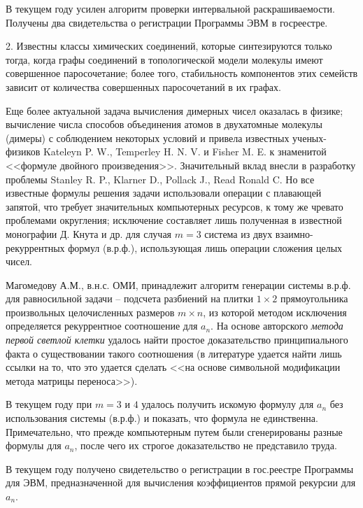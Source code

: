 В текущем году усилен алгоритм проверки интервальной раскрашиваемости. Получены два свидетельства о регистрации Программы ЭВМ в госреестре.

2. Известны классы химических соединений, которые синтезируются только тогда, когда графы соединений в топологической модели молекулы имеют совершенное паросочетание; более того, стабильность компонентов этих семейств зависит от количества совершенных паросочетаний в их графах.

Еще более актуальной задача вычисления димерных чисел оказалась в физике; вычисление числа способов объединения атомов в двухатомные молекулы (димеры) с соблюдением некоторых условий и привела известных ученых-физиков Kateleyn P. W., Temperley H. N. V. и Fisher M. E. к знаменитой <<формуле двойного произведения>>. Значительный вклад внесли в разработку проблемы Stanley R. P., Klarner D., Pollack J., Read Ronald C. Но все известные формулы решения задачи использовали операции с плавающей запятой, что требует значительных компьютерных ресурсов, к тому же чревато проблемами округления; исключение составляет лишь полученная в известной монографии Д. Кнута и др. для случая $m=3$ система из двух взаимно-рекуррентных формул (в.р.ф.), использующая лишь операции сложения целых чисел.

Магомедову А.М., в.н.с. ОМИ, принадлежит алгоритм генерации системы в.р.ф. для равносильной задачи -- подсчета разбиений на плитки $1\times2$ прямоугольника произвольных целочисленных размеров $m\times n$, из которой методом исключения определяется рекуррентное соотношение для $a_n$. На основе авторского \textit{ метода первой светлой клетки} удалось найти простое доказательство принципиального факта о существовании такого соотношения (в литературе удается найти лишь ссылки на то, что это удается сделать <<на основе символьной модификации метода матрицы переноса>>).

В текущем году при $m=3$ и $4$ удалось получить искомую формулу для $a_n$ без использования системы (в.р.ф.) и показать, что формула не единственна. Примечательно, что прежде компьютерным путем были сгенерированы разные формулы для $a_n$, после чего их строгое доказательство не представило труда.

В текущем году получено свидетельство о регистрации в гос.реестре Программы для ЭВМ, предназначенной для вычисления коэффициентов прямой рекурсии для $a_n$.


